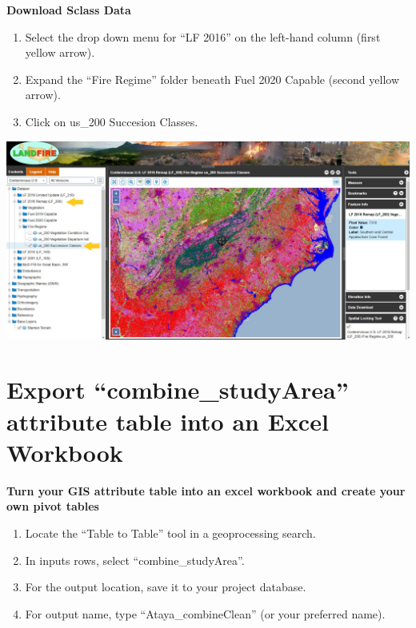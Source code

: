 \documentclass[
]{book}
\providecommand{\tightlist}{%
  \setlength{\itemsep}{0pt}\setlength{\parskip}{0pt}}
\begin{document}
\textbf{Download Sclass Data}

\begin{enumerate}
\def\labelenumi{\arabic{enumi}.}
\tightlist
\item
  Select the drop down menu for ``LF 2016'' on the left-hand column (first yellow arrow).
\item
  Expand the ``Fire Regime'' folder beneath Fuel 2020 Capable (second yellow arrow).
\item
  Click on us\_200 Succesion Classes.
\end{enumerate}

\includegraphics[width=1000pt]{KP_screenshots/LANDFIRE Find sClass}

\hypertarget{export-combine_studyarea-attribute-table-into-an-excel-workbook}{%
\section{Export ``combine\_studyArea'' attribute table into an Excel Workbook}\label{export-combine_studyarea-attribute-table-into-an-excel-workbook}}

\textbf{Turn your GIS attribute table into an excel workbook and create your own pivot tables}

\begin{enumerate}
\def\labelenumi{\arabic{enumi}.}
\tightlist
\item
  Locate the ``Table to Table'' tool in a geoprocessing search.
\item
  In inputs rows, select ``combine\_studyArea''.
\item
  For the output location, save it to your project database.
\item
  For output name, type ``Ataya\_combineClean'' (or your preferred name).
\end{enumerate}
\end{document}
